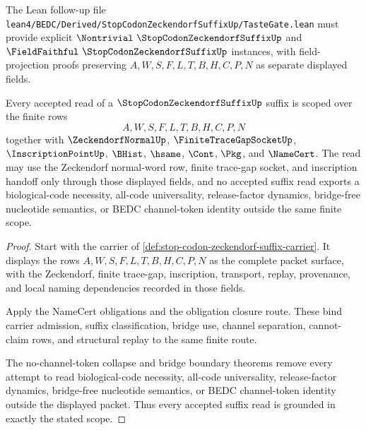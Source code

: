 The Lean follow-up file \texttt{lean4/BEDC/Derived/StopCodonZeckendorfSuffixUp/TasteGate.lean} must provide explicit $\Nontrivial\ \StopCodonZeckendorfSuffixUp$ and $\FieldFaithful\ \StopCodonZeckendorfSuffixUp$ instances, with field-projection proofs preserving $A,W,S,F,L,T,B,H,C,P,N$ as separate displayed fields.

\begin{theorem}
\label{thm:stop-codon-zeckendorf-suffix-scope-grounding}
Every accepted read of a $\StopCodonZeckendorfSuffixUp$ suffix is scoped over
the finite rows
$$
A,W,S,F,L,T,B,H,C,P,N
$$
together with $\ZeckendorfNormalUp$, $\FiniteTraceGapSocketUp$,
$\InscriptionPointUp$, $\BHist$, $\hsame$, $\Cont$, $\Pkg$, and $\NameCert$.
The read may use the Zeckendorf normal-word row, finite trace-gap socket, and
inscription handoff only through those displayed fields, and no accepted suffix
read exports a biological-code necessity, all-code universality,
release-factor dynamics, bridge-free nucleotide semantics, or BEDC
channel-token identity outside the same finite scope.
\end{theorem}
\begin{proof}
Start with the carrier of
\autoref{def:stop-codon-zeckendorf-suffix-carrier}. It displays the rows
$A,W,S,F,L,T,B,H,C,P,N$ as the complete packet surface, with the Zeckendorf,
finite trace-gap, inscription, transport, replay, provenance, and local naming
dependencies recorded in those fields.

Apply the NameCert obligations and the obligation closure route. These bind
carrier admission, suffix classification, bridge use, channel separation,
cannot-claim rows, and structural replay to the same finite route.

The no-channel-token collapse and bridge boundary theorems remove every
attempt to read biological-code necessity, all-code universality,
release-factor dynamics, bridge-free nucleotide semantics, or BEDC
channel-token identity outside the displayed packet. Thus every accepted suffix
read is grounded in exactly the stated scope.
\end{proof}


